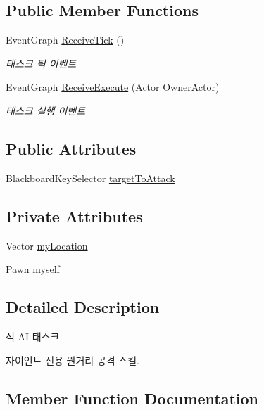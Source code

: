 \subsection*{Public Member Functions}
\begin{DoxyCompactItemize}
\item 
Event\+Graph \hyperlink{class_giant_ranged_attack___b_t_task_a08873a799a869f1231ce8d57368ecaad}{Receive\+Tick} ()
\begin{DoxyCompactList}\small\item\em 태스크 틱 이벤트 \end{DoxyCompactList}\item 
Event\+Graph \hyperlink{class_giant_ranged_attack___b_t_task_a88fd0faaab423bc283f4ded45881da6f}{Receive\+Execute} (Actor Owner\+Actor)
\begin{DoxyCompactList}\small\item\em 태스크 실행 이벤트 \end{DoxyCompactList}\end{DoxyCompactItemize}
\subsection*{Public Attributes}
\begin{DoxyCompactItemize}
\item 
Blackboard\+Key\+Selector \hyperlink{class_giant_ranged_attack___b_t_task_ad33350d20d5e08acc84fd65329562c63}{target\+To\+Attack}
\end{DoxyCompactItemize}
\subsection*{Private Attributes}
\begin{DoxyCompactItemize}
\item 
Vector \hyperlink{class_giant_ranged_attack___b_t_task_ad94fd43a278b675d241d6bfbea59efbf}{my\+Location}
\item 
Pawn \hyperlink{class_giant_ranged_attack___b_t_task_a897ee13f9ddeaa6e59a58ac85b7da3db}{myself}
\end{DoxyCompactItemize}


\subsection{Detailed Description}
적 AI 태스크 

자이언트 전용 원거리 공격 스킬. 

\subsection{Member Function Documentation}
